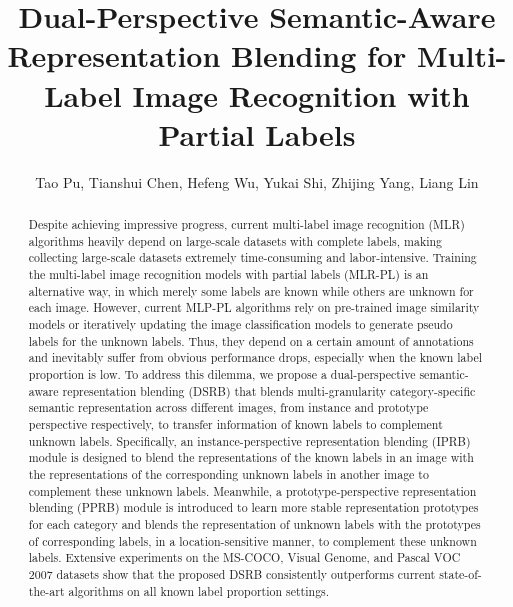\documentclass[lettersize,journal]{IEEEtran}
\begin{document}
\title{Dual-Perspective Semantic-Aware Representation Blending for Multi-Label Image Recognition with Partial Labels}


\author{Tao Pu, Tianshui Chen, Hefeng Wu, Yukai Shi, Zhijing Yang, Liang Lin
}




\maketitle



\begin{abstract}
Despite achieving impressive progress, current multi-label image recognition (MLR) algorithms heavily depend on large-scale datasets with complete labels, making collecting large-scale datasets extremely time-consuming and labor-intensive. Training the multi-label image recognition models with partial labels (MLR-PL) is an alternative way, in which merely some labels are known while others are unknown for each image. However, current MLP-PL algorithms rely on pre-trained image similarity models or iteratively updating the image classification models to generate pseudo labels for the unknown labels. Thus, they depend on a certain amount of annotations and inevitably suffer from obvious performance drops, especially when the known label proportion is low. To address this dilemma, we propose a dual-perspective semantic-aware representation blending (DSRB) that blends multi-granularity category-specific semantic representation across different images, from instance and prototype perspective respectively, to transfer information of known labels to complement unknown labels. Specifically, an instance-perspective representation blending (IPRB) module is designed to blend the representations of the known labels in an image with the representations of the corresponding unknown labels in another image to complement these unknown labels. Meanwhile, a prototype-perspective representation blending (PPRB) module is introduced to learn more stable representation prototypes for each category and blends the representation of unknown labels with the prototypes of corresponding labels, in a location-sensitive manner, to complement these unknown labels. Extensive experiments on the MS-COCO, Visual Genome, and Pascal VOC 2007 datasets show that the proposed DSRB consistently outperforms current state-of-the-art algorithms on all known label proportion settings. 
\end{abstract}
\end{document}
